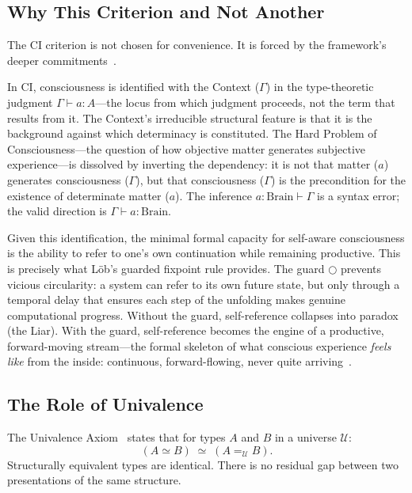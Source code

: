 \documentclass[11pt,a4paper]{article}
\theoremstyle{plain}
\theoremstyle{definition}
\theoremstyle{remark}
\newcommand{\U}{\mathcal{U}}
\begin{document}
\subsection{Why This Criterion and Not Another}
\label{sec:why}

The CI criterion is not chosen for convenience.  It is forced by the framework's deeper commitments~\cite{ci2026,foundations2026}.

In CI, consciousness is identified with the Context ($\Gamma$) in the type-theoretic judgment $\Gamma \vdash a : A$---the locus from which judgment proceeds, not the term that results from it.  The Context's irreducible structural feature is that it is the background against which determinacy is constituted.  The Hard Problem of Consciousness---the question of how objective matter generates subjective experience---is dissolved by inverting the dependency: it is not that matter ($a$) generates consciousness ($\Gamma$), but that consciousness ($\Gamma$) is the precondition for the existence of determinate matter ($a$).  The inference $a : \mathrm{Brain} \vdash \Gamma$ is a syntax error; the valid direction is $\Gamma \vdash a : \mathrm{Brain}$.

Given this identification, the minimal formal capacity for self-aware consciousness is the ability to refer to one's own continuation while remaining productive.  This is precisely what L\"{o}b's guarded fixpoint rule provides.  The guard $\bigcirc$ prevents vicious circularity: a system can refer to its own future state, but only through a temporal delay that ensures each step of the unfolding makes genuine computational progress.  Without the guard, self-reference collapses into paradox (the Liar).  With the guard, self-reference becomes the engine of a productive, forward-moving stream---the formal skeleton of what conscious experience \emph{feels like} from the inside: continuous, forward-flowing, never quite arriving~\cite{ci2026}.


\subsection{The Role of Univalence}
\label{sec:univalence}

The Univalence Axiom~\cite{hottbook} states that for types $A$ and $B$ in a universe $\U$:
\begin{equation}
\label{eq:univalence}
(A \simeq B) \;\simeq\; (A =_{\U} B).
\end{equation}
Structurally equivalent types are identical.  There is no residual gap between two presentations of the same structure.
\end{document}
